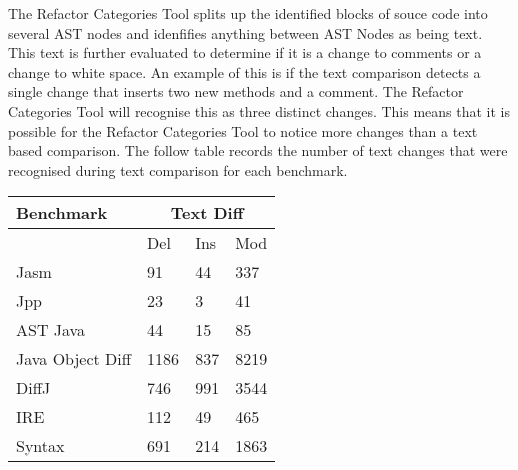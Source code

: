 The Refactor Categories Tool splits up the identified blocks of souce code into several AST nodes and idenfifies anything between AST Nodes as being text. This text is further evaluated to determine if it is a change to comments or a change to white space. An example of this is if the text comparison detects a single change that inserts two new methods and a comment.  The Refactor Categories Tool will recognise this as three distinct changes. This means that it is possible for the Refactor Categories Tool to notice more changes than a text based comparison. The follow table records the number of text changes that were recognised during text comparison for each benchmark.

\begin{table}[H]
    \begin{tabular}{l|lll}
    Benchmark        & \multicolumn{3}{|c}{Text Diff} \\ \hline
    ~                & Del            & Ins & Mod  \\ \hline
    Jasm             & 91             & 44  & 337  \\
    Jpp              & 23             & 3   & 41   \\
    AST Java         & 44             & 15  & 85   \\
    Java Object Diff & 1186           & 837 & 8219 \\
    DiffJ            & 746            & 991 & 3544 \\
    IRE              & 112            & 49  & 465  \\
    Syntax           & 691            & 214 & 1863 \\
    \end{tabular}
\end{table}



% 
% 
% 

